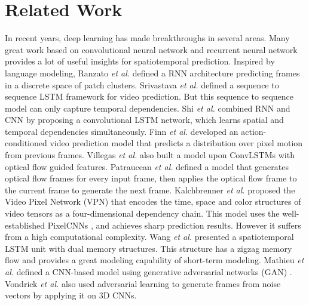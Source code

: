 \documentclass[10pt,twocolumn,letterpaper]{article}
\begin{document}
\section{Related Work}
\label{sec:Related}
In recent years, deep learning has made breakthroughs in several areas. Many great work based on convolutional neural network \citep{krizhevsky2012imagenet} and recurrent neural network \citep{Sutskever2014Sequence} provides a lot of useful insights for spatiotemporal prediction. Inspired by language modeling, Ranzato \textit{et al.} \citep{Ranzato2014Video} defined a RNN architecture predicting frames in a discrete space of patch clusters. Srivastava \textit{et al.} \citep{srivastava2015unsupervised} defined a sequence to sequence LSTM framework for video prediction. But this sequence to sequence model can only capture temporal dependencies. Shi \textit{et al.} \citep{shi2015convolutional} combined RNN and CNN by proposing a convolutional LSTM network, which learns spatial and temporal dependencies simultaneously. %
Finn \textit{et al.} \citep{Finn2016Unsupervised} developed an action-conditioned video prediction model that predicts a distribution over pixel motion from previous frames. Villegas \textit{et al.} \citep{Villegas2017Decomposing} also built a model upon ConvLSTMs with optical flow guided features. Patraucean \textit{et al.} \citep{patraucean2015spatio} defined a model that generates optical flow frames for every input frame, then applies the optical flow frame to the current frame to generate the next frame. Kalchbrenner \textit{et al.} \citep{Kalchbrenner2016Video} proposed the Video Pixel Network (VPN) that encodes the time, space and color structures of video tensors as a four-dimensional dependency chain. This model uses the well-established PixelCNNs \citep{van2016conditional}, and achieves sharp prediction results. However it suffers from a high computational complexity. Wang \textit{et al.} \citep{wang2017predrnn} presented a spatiotemporal LSTM unit with dual memory structures. This structure has a zigzag memory flow and provides a great modeling capability of short-term modeling. %
Mathieu \textit{et al.} \citep{Mathieu2015Deep} defined a CNN-based model using generative adversarial networks (GAN) \citep{Goodfellow2014Generative,Denton2015Deep}. Vondrick \textit{et al.} \citep{vondrick2016generating} also used adversarial learning to generate frames from noise vectors by applying it on 3D CNNs. 
\end{document}
